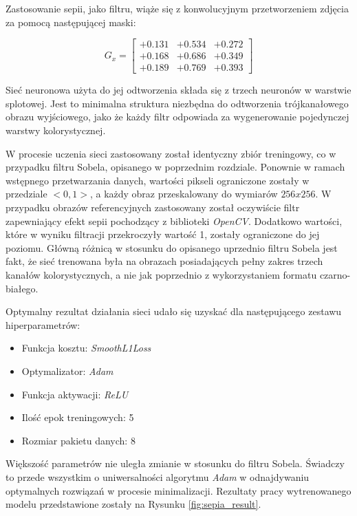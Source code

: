     Zastosowanie sepii, jako filtru, wiąże się z konwolucyjnym przetworzeniem
    zdjęcia za pomocą następującej maski:

    \[G_x =
    \begin{bmatrix}
    +0.131 & +0.534 & +0.272 \\
    +0.168 & +0.686 & +0.349 \\
    +0.189 & +0.769 & +0.393
    \end{bmatrix}
    \]

    Sieć neuronowa użyta do jej odtworzenia składa się z trzech neuronów w
    warstwie splotowej. Jest to minimalna struktura niezbędna do odtworzenia
    trójkanałowego obrazu wyjściowego, jako że każdy filtr odpowiada za wygenerowanie
    pojedynczej warstwy kolorystycznej.

    W procesie uczenia sieci zastosowany został identyczny zbiór treningowy, co w
    przypadku filtru Sobela, opisanego w poprzednim rozdziale. Ponownie w ramach
    wstępnego przetwarzania danych, wartości pikseli ograniczone zostały w przedziale
    $<0,1>$, a każdy obraz przeskalowany do wymiarów $256x256$. W przypadku obrazów
    referencyjnych zastosowany został oczywiście filtr zapewniający efekt sepii
    pochodzący z biblioteki \textit{OpenCV}. Dodatkowo wartości, które w wyniku filtracji
    przekroczyły wartość 1, zostały ograniczone do jej poziomu. Główną różnicą w stosunku
    do opisanego uprzednio filtru Sobela jest fakt, że sieć trenowana była na
    obrazach posiadających pełny zakres trzech kanałów kolorystycznych, a nie jak
    poprzednio z wykorzystaniem formatu czarno-białego.

    Optymalny rezultat działania sieci udało się uzyskać dla następującego
    zestawu hiperparametrów:

    \begin{itemize}
    \item Funkcja kosztu: \textit{SmoothL1Loss}
    \item Optymalizator: \textit{Adam}
    \item Funkcja aktywacji: \textit{ReLU}
    \item Ilość epok treningowych: 5
    \item Rozmiar pakietu danych: 8
    \end{itemize}

    Większość parametrów nie uległa zmianie w stosunku do filtru Sobela. Świadczy to
    przede wszystkim o uniwersalności algorytmu \textit{Adam} w odnajdywaniu optymalnych
    rozwiązań w procesie minimalizacji. Rezultaty pracy wytrenowanego modelu przedstawione
    zostały na Rysunku \ref{fig:sepia_result}.

